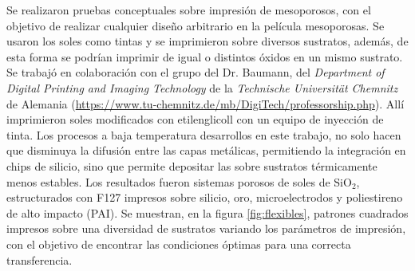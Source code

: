 { 	  Se realizaron pruebas conceptuales sobre impresión de mesoporosos, con el objetivo de realizar cualquier diseño arbitrario en la película mesoporosas. Se usaron los soles como tintas y se imprimieron sobre diversos sustratos, además, de esta forma se podrían imprimir \pdm\space de igual o distintos óxidos en un mismo sustrato. Se trabajó en colaboración con el grupo del Dr. Baumann, del \textit{Department of Digital Printing and Imaging Technology} de la \textit{Technische Universität Chemnitz} de Alemania (\url{https://www.tu-chemnitz.de/mb/DigiTech/professorship.php}). Allí imprimieron soles modificados con etilenglicoll con un equipo de inyección de tinta. Los procesos a baja temperatura desarrollos en este trabajo, no solo hacen que disminuya la difusión entre las capas metálicas, permitiendo la integración en chips de silicio, sino que permite depositar las \pdm\space sobre sustratos térmicamente menos estables. Los resultados fueron sistemas porosos de soles de SiO$_2$, estructurados con F127 impresos sobre silicio, oro, microelectrodos y poliestireno de alto impacto (PAI). Se muestran, en la figura \ref{fig:flexibles}, patrones cuadrados impresos sobre una diversidad de sustratos variando los parámetros de impresión, con el objetivo de encontrar las condiciones óptimas para una correcta transferencia.

}
